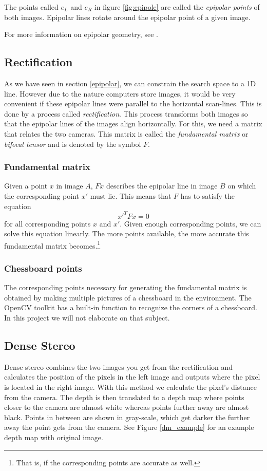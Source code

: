 \documentclass[a4paper]{article}
\begin{document}
The points called $e_{L}$ and $e_{R}$ in figure \ref{fig:epipole} are
called the \emph{epipolar points} of both images. Epipolar lines
rotate around the epipolar point of a given image.

For more information on epipolar geometry, see \cite{Hartley2004}.

\subsection{Rectification}
\label{rectification} As we have seen in section \ref{epipolar}, we
can constrain the search space to a 1D line. However due to the nature
computers store images, it would be very convenient if these epipolar
lines were parallel to the horizontal scan-lines.  This is done by a
process called \emph{rectification}. This process transforms both
images so that the epipolar lines of the images align
horizontally. For this, we need a matrix that relates the two
cameras. This matrix is called the \emph{fundamental matrix} or
\emph{bifocal tensor} and is denoted by the symbol $F$.

\subsubsection{Fundamental matrix} Given a point $x$ in image $A$,
$Fx$ describes the epipolar line in image $B$ on which the
corresponding point $x'$ must lie. This means that $F$ has to satisfy
the equation
\[ x'^{T}Fx = 0 \] for all corresponding points $x$ and $x'$. Given
enough corresponding points, we can solve this equation linearly. The
more points available, the more accurate this fundamental matrix
becomes.\footnote{That is, if the corresponding points are accurate as
well.}

\subsubsection{Chessboard points} The corresponding points necessary
for generating the fundamental matrix is obtained by making multiple
pictures of a chessboard in the environment. The OpenCV toolkit has a
built-in function to recognize the corners of a chessboard.  In this
project we will not elaborate on that subject.

\subsection{Dense Stereo} 
Dense stereo combines the two images you get from the rectification
and calculates the position of the pixels in the left image and
outputs where the pixel is located in the right image. With this
method we calculate the pixel's distance from the camera.  The depth
is then translated to a depth map where points closer to the camera
are almost white whereas points further away are almost black. Points
in between are shown in gray-scale, which get darker the further away
the point gets from the camera. See Figure \ref{dm_example} for an
example depth map with original image.
\end{document}
